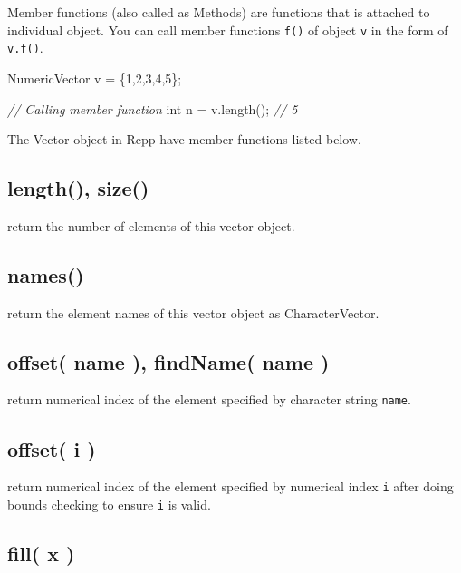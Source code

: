 \documentclass[]{book}
\newenvironment{Shaded}{\begin{snugshade}}{\end{snugshade}}
\newcommand{\DataTypeTok}[1]{\textcolor[rgb]{0.13,0.29,0.53}{#1}}
\newcommand{\DecValTok}[1]{\textcolor[rgb]{0.00,0.00,0.81}{#1}}
\newcommand{\CommentTok}[1]{\textcolor[rgb]{0.56,0.35,0.01}{\textit{#1}}}
\newcommand{\NormalTok}[1]{#1}
\theoremstyle{definition}
\theoremstyle{definition}
\theoremstyle{remark}
\begin{document}
Member functions (also called as Methods) are functions that is attached
to individual object. You can call member functions \texttt{f()} of
object \texttt{v} in the form of \texttt{v.f()}.

\begin{Shaded}
\begin{Highlighting}[]
\NormalTok{NumericVector v = \{}\DecValTok{1}\NormalTok{,}\DecValTok{2}\NormalTok{,}\DecValTok{3}\NormalTok{,}\DecValTok{4}\NormalTok{,}\DecValTok{5}\NormalTok{\};}

\CommentTok{// Calling member function}
\DataTypeTok{int}\NormalTok{ n = v.length(); }\CommentTok{// 5}
\end{Highlighting}
\end{Shaded}

The Vector object in Rcpp have member functions listed below.

\subsection{length(), size()}\label{length-size}

return the number of elements of this vector object.

\subsection{names()}\label{names}

return the element names of this vector object as CharacterVector.

\subsection{offset( name ), findName( name
)}\label{offset-name-findname-name}

return numerical index of the element specified by character string
\texttt{name}.

\subsection{offset( i )}\label{offset-i}

return numerical index of the element specified by numerical index
\texttt{i} after doing bounds checking to ensure \texttt{i} is valid.

\subsection{fill( x )}\label{fill-x}
\end{document}
